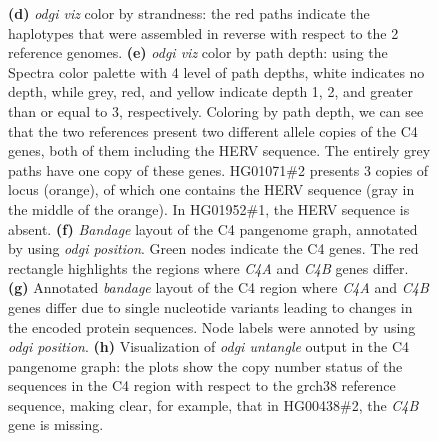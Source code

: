 \begin{figure}[!htb]
{        \textbf{(d)} \textit{odgi viz} color by strandness: the red paths indicate the haplotypes that were assembled in reverse with respect to the 2 reference genomes.
        \textbf{(e)} \textit{odgi viz} color by path depth: using the Spectra color palette with 4 level of path depths, white indicates no depth, while grey, red, and yellow indicate depth 1, 2, and greater than or equal to 3, respectively.
        Coloring by path depth, we can see that the two references present two different allele copies of the C4 genes, both of them including the HERV sequence.
        The entirely grey paths have one copy of these genes.
        HG01071\#2 presents 3 copies of locus (orange), of which one contains the HERV sequence (gray in the middle of the orange).
        In HG01952\#1, the HERV sequence is absent.
        \textbf{(f)} \textit{Bandage} layout of the C4 pangenome graph, annotated by using \textit{odgi position}. Green nodes indicate the C4 genes. The red rectangle highlights the regions where \textit{C4A} and \textit{C4B} genes differ.
        \textbf{(g)} Annotated \textit{bandage} layout of the C4 region where \textit{C4A} and \textit{C4B} genes differ due to single nucleotide variants leading to changes in the encoded protein sequences. Node labels were annoted by using \textit{odgi position}.
        \textbf{(h)} Visualization of \textit{odgi untangle} output in the C4 pangenome graph: the plots show the copy number status of the sequences in the C4 region with respect to the grch38 reference sequence, making clear, for example, that in HG00438\#2, the \textit{C4B} gene is missing.
    }
    \label{fig:odgi_viz}
\end{figure}



